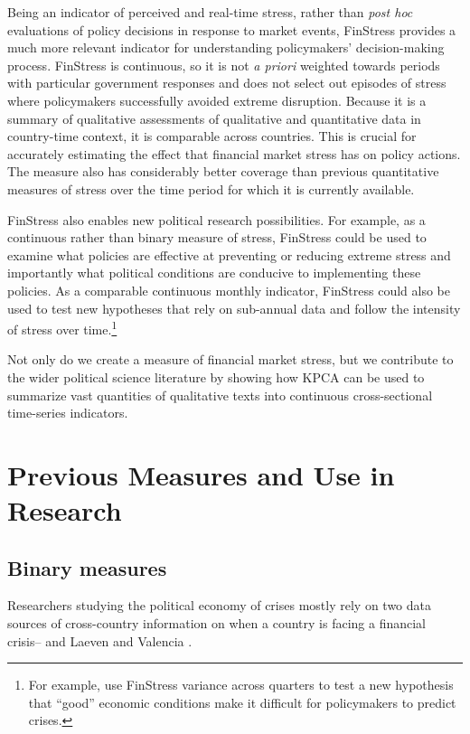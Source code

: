 \documentclass[]{article}
\begin{document}
Being an indicator of perceived and real-time stress, rather than \emph{post hoc} evaluations of policy decisions in response to market events, FinStress provides a much more relevant indicator for understanding policymakers' decision-making process. FinStress is continuous, so it is not \textit{a priori} weighted towards periods with particular government responses and does not select out episodes of stress where policymakers successfully avoided extreme disruption. Because it is a summary of qualitative assessments of qualitative and quantitative data in country-time context, it is comparable across countries. This is crucial for accurately estimating the effect that financial market stress has on policy actions. The measure also has considerably better coverage than previous quantitative measures of stress over the time period for which it is currently available.

FinStress also enables new political research possibilities. For example, as a continuous rather than binary measure of stress, FinStress could be used to examine what policies are effective at preventing or reducing extreme stress and importantly what political conditions are conducive to implementing these policies. As a comparable continuous monthly indicator, FinStress could also be used to test new hypotheses that rely on sub-annual data and follow the intensity of stress over time.\footnote{For example, \cite{gandrud_pepinsky2015} use FinStress variance across quarters to test a new hypothesis that ``good'' economic conditions make it difficult for policymakers to predict crises.}

Not only do we create a measure of financial market stress, but we contribute to the wider political science literature by showing how KPCA can be used to summarize vast quantities of qualitative texts into continuous cross-sectional time-series indicators.

\section{Previous Measures and Use in Research}\label{motivation}

\subsection{Binary measures}

Researchers studying the political economy of crises mostly rely on two data sources of cross-country information on when a country is facing a financial crisis--\cite{Reinhart2009,ReinhartRog2010} and Laeven and Valencia \citeyearpar[and their predecessors]{laeven2013}.
\end{document}
